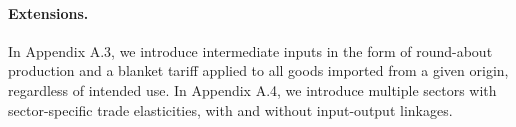\documentclass[12pt]{article}
\begin{document}



\paragraph{Extensions.} In Appendix A.3, we introduce intermediate inputs in the form of round-about production and a blanket tariff applied to all goods imported from a given origin, regardless of intended use. In Appendix A.4, we introduce multiple sectors with sector-specific trade elasticities, with and without input-output linkages. 
\end{document}
